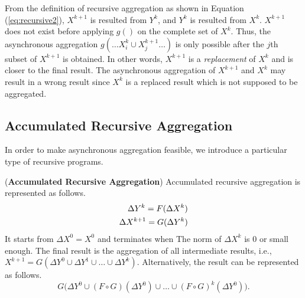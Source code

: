 From the definition of recursive aggregation as shown in Equation (\ref{eq:recursive2}), $X^{k+1}$ is resulted from $Y^k$, and $Y^k$ is resulted from $X^k$. $X^{k+1}$ does not exist before applying $g()$ on the complete set of $X^k$. Thus, the asynchronous aggregation $g(\ldots X_i^k\cup X_j^{k+1} \ldots)$ is only possible after the $j$th subset of $X^{k+1}$ is obtained. In other words, $X^{k+1}$ is a \emph{replacement} of $X^k$ and is closer to the final result. The asynchronous aggregation of $X^{k+1}$ and $X^k$ may result in a wrong result since $X^k$ is a replaced result which is not supposed to be aggregated.

\subsection{Accumulated Recursive Aggregation}
\label{sec:async:accrec}

In order to make asynchronous aggregation feasible, we introduce a particular type of recursive programs.

\begin{definition}
	\label{def:accumasync}
	(\textbf{Accumulated Recursive Aggregation}) Accumulated recursive aggregation is represented as follows.
	\begin{equation}\label{eq:accumasync}
	\begin{aligned}
	\Delta Y^{k}= F(\Delta X^k)\notag\\
	\Delta X^{k+1}= G(\Delta Y^{k})\notag
	\end{aligned}
	\end{equation}
	It starts from $\Delta X^0=X^0$ and terminates when The norm of $\Delta X^k$ is 0 or small enough. The final result is the aggregation of all intermediate results, i.e., $X^{k+1}=G(\Delta Y^{0} \cup \Delta Y^{1} \cup \ldots \cup \Delta Y^{k})$. Alternatively, the result can be represented as follows.
	\begin{equation}
	\label{eq:accumasyncres}
	G\Big(\Delta Y^0\cup (F\circ G)(\Delta Y^0)\cup\ldots\cup (F\circ G)^k(\Delta Y^0)\Big).
	\end{equation}
\end{definition}

